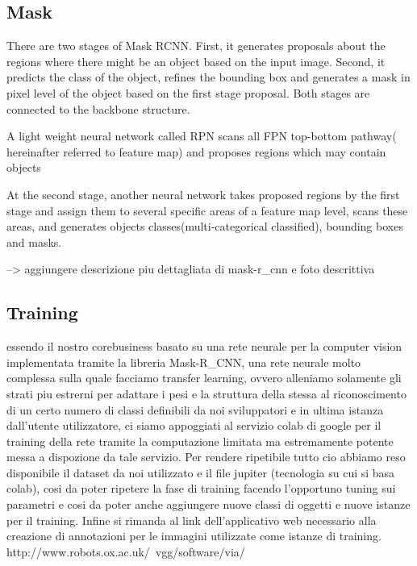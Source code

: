 \documentclass[12pt,a4paper]{article}
\begin{document}
\subsection{Mask}

There are two stages of Mask RCNN. First, 
it generates proposals about the regions where there 
might be an object based on the input image. Second, it predicts 
the class of the object, refines the bounding box and generates a mask in 
pixel level of the object based on the first stage proposal. 
Both stages are connected to the backbone structure.

A light weight neural network called RPN scans all FPN top-bottom pathway( hereinafter referred to feature map) and proposes regions which may contain objects

At the second stage, another neural network takes proposed regions by the first stage and assign them to several specific areas of a feature map level, scans these areas, and generates objects classes(multi-categorical classified), bounding boxes and masks.



--> aggiungere descrizione piu dettagliata di mask-r_cnn e foto descrittiva

\subsection{Training}

essendo il nostro corebusiness basato su una rete neurale per la computer vision implementata tramite la libreria Mask-R_CNN, 
una rete neurale molto complessa sulla quale facciamo transfer learning, ovvero alleniamo solamente gli strati piu estrerni per adattare i pesi e la struttura
della stessa al riconoscimento di un certo numero di classi definibili da noi sviluppatori e in ultima istanza dall'utente utilizzatore, ci siamo appoggiati
al servizio colab di google per il training della rete tramite la computazione limitata ma estremamente potente messa 
a dispozione da tale servizio.
Per rendere ripetibile tutto cio abbiamo reso disponibile il dataset da noi utilizzato e il file jupiter (tecnologia su cui si basa colab),
cosi da poter ripetere la fase di training facendo l'opportuno tuning sui parametri e cosi da poter anche aggiungere nuove classi di oggetti e nuove istanze per il training.
Infine si rimanda al link dell'applicativo web necessario alla creazione di annotazioni per le immagini utilizzate come istanze di training.
http://www.robots.ox.ac.uk/~vgg/software/via/ \\
\end{document}
